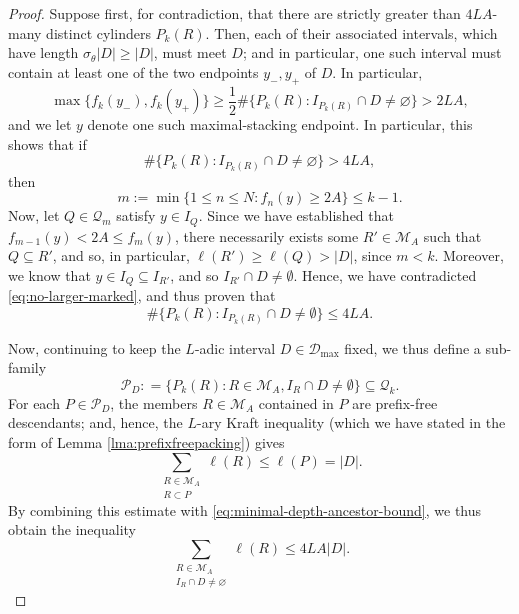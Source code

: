 \documentclass[12pt]{amsart}
\numberwithin{equation}{section}
\newcommand{\R}{\mathbb{R}}
\newcommand{\I}{\mathbb I}
\begin{document}
\begin{proof}
Suppose first, for contradiction, that there are strictly greater than $4LA$-many distinct cylinders $P_k(R)$. Then, each of their associated intervals, which have length $\sigma_\theta|D|\geq|D|$, must meet $D$; and in particular, one such interval must contain at least one of the two endpoints $y_-, y_+$ of $D$. In particular, 
\[
\max \{f_k(y_-), f_k(y_+)\} \geq\frac12\#\{P_k(R):I_{P_k(R)}\cap D\neq\varnothing\}>2LA,
\]
and we let $y$ denote one such maximal-stacking endpoint.
In particular, this shows that if
$$
\#\{P_k(R):I_{P_k(R)}\cap D\neq\varnothing\} > 4LA,
$$
then
\begin{equation}\label{eq:contradiction-index}
m :=\min \big\{1 \leq n \leq N : f_n (y) \geq 2 A\big\} \leq k - 1.
\end{equation}
Now, let $Q \in \mathscr{Q}_m$ satisfy $y \in I_Q$. Since we have established that $f_{m-1} (y) < 2 A \leq f_m (y)$, there necessarily exists some $R' \in \mathscr{M}_A$ such that $Q \subseteq R'$, and so, in particular, $\ell (R') \geq \ell (Q) > |D|$, since $m < k$. Moreover, we know that $y \in I_Q \subseteq I_{R'}$, and so $I_{R'} \cap D \neq \emptyset$. Hence, we have contradicted \eqref{eq:no-larger-marked}, and thus proven that
\begin{equation}\label{eq:minimal-depth-ancestor-bound}
\# \{P_k (R) : I_{P_k(R)} \cap D \neq \emptyset \} \leq 4LA.
\end{equation}

Now, continuing to keep the $L$-adic interval $D \in \mathcal{D}_{\max}$ fixed, we thus define a sub-family
$$
\mathscr{P}_D : = \big\{P_k (R) : R \in \mathscr{M}_A, I_R \cap D \neq \emptyset \} \subseteq \mathscr{Q}_k.
$$
For each $P\in \mathscr{P}_D$, the members $R \in \mathscr M_A$ contained in $P$ are prefix-free descendants; and, hence, the $L$-ary Kraft inequality (which we have stated in the form of Lemma \ref{lma:prefixfreepacking}) gives
$$
 \sum_{\substack{R\in\mathscr M_A\\R\subset P}}\ell(R)\leq\ell(P)=|D|.
$$
By combining this estimate with \eqref{eq:minimal-depth-ancestor-bound}, we thus obtain the inequality
\begin{equation}\label{eq:local-packing}
 \sum_{\substack{R\in\mathscr M_A\\I_R\cap D\neq\varnothing}}\ell(R)
 \leq4LA|D|.
\end{equation}


\end{proof}
\end{document}
